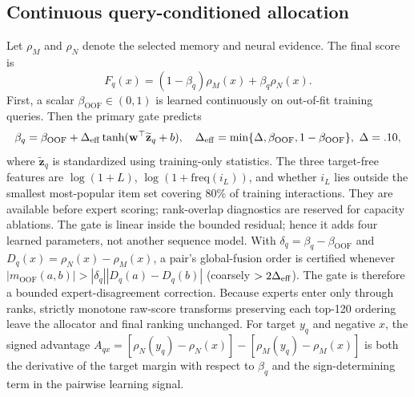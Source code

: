\documentclass[runningheads]{llncs}
\newcommand{\rr}{\rho}
\begin{document}
\subsection{Continuous query-conditioned allocation}
Let $\rr_M$ and $\rr_N$ denote the selected memory and neural evidence. The
final score is
\begin{equation}
F_q(x)=(1-\beta_q)\rr_M(x)+\beta_q\rr_N(x).
\label{eq:fusion}
\end{equation}
First, a scalar $\beta_{\mathrm{OOF}}\in(0,1)$ is learned continuously on
out-of-fit training queries. Then the primary gate predicts
\begin{equation}
\beta_q=\beta_{\mathrm{OOF}}+
\Delta_{\rm eff}\tanh(\mathbf w^\top\widetilde{\mathbf z}_q+b),\quad
\Delta_{\rm eff}=\min\{\Delta,\beta_{\mathrm{OOF}},
1-\beta_{\mathrm{OOF}}\},\ \Delta=.10,
\label{eq:gate}
\end{equation}
where $\widetilde{\mathbf z}_q$ is standardized using training-only
statistics. The three target-free features are
$\log(1+L)$, $\log(1+\mathrm{freq}(i_L))$, and whether $i_L$ lies outside
the smallest most-popular item set covering 80\% of training interactions.
They are available before expert scoring; rank-overlap diagnostics are
reserved for capacity ablations.
The gate is linear inside the bounded residual; hence it
adds four learned parameters, not another sequence model.
With $\delta_q=\beta_q-\beta_{\mathrm{OOF}}$ and
$D_q(x)=\rr_N(x)-\rr_M(x)$, a pair's global-fusion order is certified whenever
$|m_{\mathrm{OOF}}(a,b)|>|\delta_q||D_q(a)-D_q(b)|$ (coarsely
$>2\Delta_{\rm eff}$). The gate is therefore a bounded expert-disagreement
correction. Because experts enter only through ranks, strictly monotone
raw-score transforms preserving each top-120 ordering leave the allocator and
final ranking unchanged.
For target $y_q$ and negative $x$, the signed advantage
$A_{qx}=[\rr_N(y_q)-\rr_N(x)]-[\rr_M(y_q)-\rr_M(x)]$ is both the derivative
of the target margin with respect to $\beta_q$ and the sign-determining term
in the pairwise learning signal.
\end{document}
